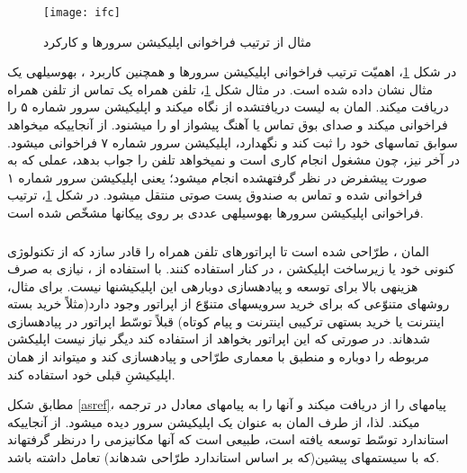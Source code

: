 \begin{figure}[h]
\centering
\texttt{[image: ifc]}
\caption{مثال از ترتیب فراخوانی اپلیکیشن سرورها و کارکرد }
\label{ifc}
\end{figure}

در شکل \ref{ifc}، اهمیّت ترتیب فراخوانی اپلیکیشن سرورها و همچنین کاربرد ، به\nf وسیله\nf ی یک مثال نشان داده شده است. در مثال شکل \ref{ifc}، تلفن همراه  یک تماس از تلفن همراه  دریافت می\nf کند. المان  به لیست دریافت\nf شده از  نگاه می\nf کند و اپلیکیشن سرور شماره ۵ را فراخوانی می\nf کند و  صدای بوق تماس  یا آهنگ پیشواز او را می\nf شنود. از آنجایی\nf که  می\nf خواهد سوابق تماس\nf های خود را ثبت کند و نگه\nf دارد، اپلیکیشن سرور شماره ۷ فراخوانی می\nf شود. در آخر نیز، چون  مشغول انجام کاری است و نمی\nf خواهد تلفن  را جواب بدهد، عملی که به صورت پیش\nf فرض در نظر گرفته\nf شده انجام می\nf شود؛ یعنی اپلیکیشن سرور شماره ۱ فراخوانی شده و تماس به صندوق پست صوتی منتقل می\nf شود. در شکل \ref{ifc}، ترتیب فراخوانی اپلیکیشن سرورها به\nf وسیله\nf ی عددی بر روی پیکان\nf ها مشخّص شده است. 

\subsubsection{}
المان ، طرّاحی شده است تا اپراتورهای تلفن همراه را قادر سازد که از تکنولوژی  کنونی خود یا زیرساخت اپلیکشن ، در کنار  استفاده کنند. با استفاده از ، نیازی به صرف هزینه\nf ی بالا برای توسعه و پیاده\nf سازی دوباره\nf ی این اپلیکیشن\nf ها نیست. برای مثال، روش\nf های متنوّعی که برای خرید سرویس\nf های متنوّع از اپراتور وجود دارد(مثلاً خرید بسته اینترنت یا خرید بسته\nf ی ترکیبی اینترنت و پیام کوتاه) قبلاً توسّط اپراتور در  پیاده\nf سازی شده\nf اند. در صورتی که این اپراتور بخواهد از  استفاده کند دیگر نیاز نیست اپلیکشن مربوطه را دوباره و منطبق با معماری  طرّاحی و پیاده\nf سازی کند و می\nf تواند از همان اپلیکیشنِ قبلی خود استفاده کند.


مطابق شکل \ref{asref}،  پیام\nf های  را از  دریافت می\nf کند و آن\nf ها را به پیام\nf های معادل در  ترجمه می\nf کند. لذا،  از طرف المان  به عنوان یک اپلیکیشن سرور دیده می\nf شود. از آنجایی\nf که استاندارد   توسّط  توسعه یافته است، طبیعی است که آن\nf ها مکانیزمی را درنظر گرفته\nf اند که  با سیستم\nf های پیشین(که بر اساس استاندارد  طرّاحی شده\nf اند) تعامل داشته باشد.


